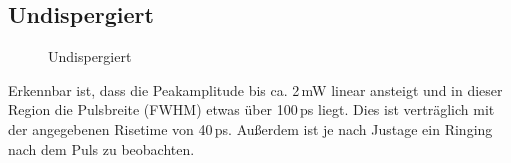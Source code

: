 \documentclass[bachelor,       %
               twoside,        %
               BCOR10mm,       %
               english,ngerman, %
               ]{GAUBM}
\begin{document}
\subsection{Undispergiert}
\begin{figure}[!htb]
	\centering
   \hfill
	\caption{Undispergiert}
	\label{fig:PDundisp}
\end{figure}

Erkennbar ist, dass die Peakamplitude bis ca. 2\,mW linear ansteigt und in dieser Region die Pulsbreite (FWHM) etwas über 100\,ps liegt.
Dies ist verträglich mit der angegebenen Risetime von 40\,ps.
Außerdem ist je nach Justage ein Ringing nach dem Puls zu beobachten.
\end{document}

